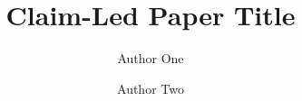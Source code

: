 \documentclass[11pt]{article}
\title{Claim-Led Paper Title}
\author{Author One \and Author Two}
\date{}
\begin{document}
\maketitle

\begin{abstract}

\end{abstract}











\appendix

\end{document}
